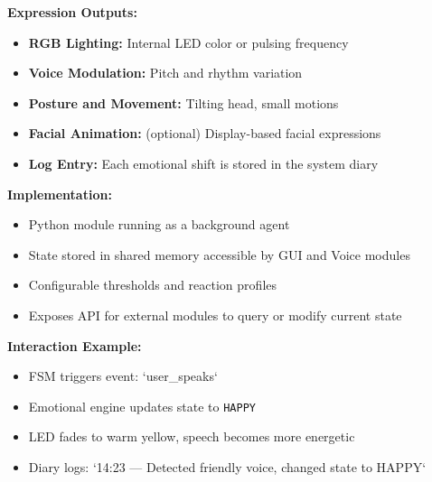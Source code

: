 \vspace{0.5cm}

\noindent\textbf{Expression Outputs:}
\begin{itemize}
    \item \textbf{RGB Lighting:} Internal LED color or pulsing frequency
    \item \textbf{Voice Modulation:} Pitch and rhythm variation
    \item \textbf{Posture and Movement:} Tilting head, small motions
    \item \textbf{Facial Animation:} (optional) Display-based facial expressions
    \item \textbf{Log Entry:} Each emotional shift is stored in the system diary
\end{itemize}

\vspace{0.5cm}

\noindent\textbf{Implementation:}
\begin{itemize}
    \item Python module running as a background agent
    \item State stored in shared memory accessible by GUI and Voice modules
    \item Configurable thresholds and reaction profiles
    \item Exposes API for external modules to query or modify current state
\end{itemize}

\vspace{0.5cm}

\noindent\textbf{Interaction Example:}

\begin{itemize}
    \item FSM triggers event: `user\_speaks`
    \item Emotional engine updates state to \texttt{HAPPY}
    \item LED fades to warm yellow, speech becomes more energetic
    \item Diary logs: `14:23 — Detected friendly voice, changed state to HAPPY`
\end{itemize}
